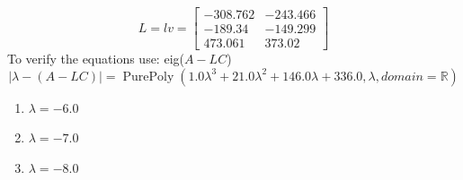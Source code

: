 \begin{enumerate}
\begin{equation}
\end{equation}
\begin{equation}
  L = lv  = \left[\begin{matrix}-308.762 & -243.466\\-189.34 & -149.299\\473.061 & 373.02\end{matrix}\right]
\end{equation}
To verify the equations use: eig($ A - LC$)
\begin{equation}
  \vert \lambda - (A - LC) \vert  = \operatorname{PurePoly}{\left( 1.0 \lambda^{3} + 21.0 \lambda^{2} + 146.0 \lambda + 336.0, \lambda, domain=\mathbb{R} \right)}
\end{equation}
\begin{enumerate}
\item $\lambda = -6.0$
\item $\lambda = -7.0$
\item $\lambda = -8.0$
\end{enumerate}


\end{enumerate}
